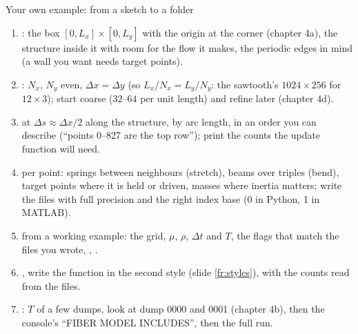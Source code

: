 \documentclass[aspectratio=169,11pt]{beamer}
\begin{document}
\begin{frame}{Your own example: from a sketch to a folder}
\label{fr:own}
\small
\begin{enumerate}
  \item {}: the box $[0, L_x] \times [0, L_y]$ with the origin at the corner (chapter 4a), the structure inside it with room for the flow it makes, the periodic edges in mind (a wall you want needs target points).
  \item {}: $N_x$, $N_y$ even, $\Delta x = \Delta y$ (so $L_x/N_x = L_y/N_y$: the sawtooth's $1024 \times 256$ for $12 \times 3$); start coarse ($32$--$64$ per unit length) and refine later (chapter 4d).
  \item {} at $\Delta s \approx \Delta x/2$ along the structure, by arc length, in an order you can describe (``points 0--827 are the top row''); print the counts the update function will need.
  \item {} per point: springs between neighbours (stretch), beams over triples (bend), target points where it is held or driven, masses where inertia matters; write the files with full precision and the right index base (0 in Python, 1 in MATLAB).
  \item {} from a working example: the grid, $\mu$, $\rho$, $\Delta t$ and $T$, the flags that match the files you wrote, , .
  \item {}, write the  function in the second style (slide \ref{fr:styles}), with the counts read from the files.
  \item {}: $T$ of a few dumps, look at dump 0000 and 0001 (chapter 4b), then the console's ``FIBER MODEL INCLUDES'', then the full run.
\end{enumerate}
\end{frame}
\end{document}
